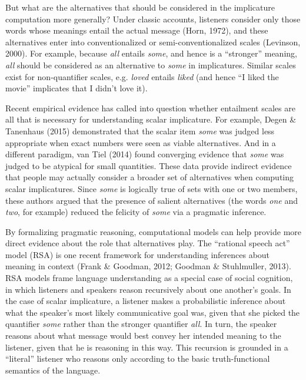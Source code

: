 \documentclass[10pt, letterpaper]{article}
\begin{document}
But what are the alternatives that should be considered in the
implicature computation more generally? Under classic accounts,
listeners consider only those words whose meanings entail the actual
message (Horn, 1972), and these alternatives enter into conventionalized
or semi-conventionalized scales (Levinson, 2000). For example, because
\emph{all} entails \emph{some}, and hence is a ``stronger'' meaning,
\emph{all} should be considered as an alternative to \emph{some} in
implicatures. Similar scales exist for non-quantifier scales, e.g.
\emph{loved} entails \emph{liked} (and hence ``I liked the movie''
implicates that I didn't love it).

Recent empirical evidence has called into question whether entailment
scales are all that is necessary for understanding scalar implicature.
For example, Degen \& Tanenhaus (2015) demonstrated that the scalar item
\emph{some} was judged less appropriate when exact numbers were seen as
viable alternatives. And in a different paradigm, {van Tiel} (2014)
found converging evidence that \emph{some} was judged to be atypical for
small quantities. These data provide indirect evidence that people may
actually consider a broader set of alternatives when computing scalar
implicatures. Since \emph{some} is logically true of sets with one or
two members, these authors argued that the presence of salient
alternatives (the words \emph{one} and \emph{two}, for example) reduced
the felicity of \emph{some} via a pragmatic inference.

By formalizing pragmatic reasoning, computational models can help
provide more direct evidence about the role that alternatives play. The
``rational speech act'' model (RSA) is one recent framework for
understanding inferences about meaning in context (Frank \& Goodman,
2012; Goodman \& Stuhlmuller, 2013). RSA models frame language
understanding as a special case of social cognition, in which listeners
and speakers reason recursively about one another's goals. In the case
of scalar implicature, a listener makes a probabilistic inference about
what the speaker's most likely communicative goal was, given that she
picked the quantifier \emph{some} rather than the stronger quantifier
\emph{all}. In turn, the speaker reasons about what message would best
convey her intended meaning to the listener, given that he is reasoning
in this way. This recursion is grounded in a ``literal'' listener who
reasons only according to the basic truth-functional semantics of the
language.
\end{document}
